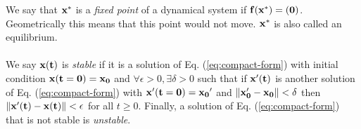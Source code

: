 We say that $\bf{x}^*$ is a \textit{fixed point} of a dynamical system if $\bf{f}(\bf{x}^*)=\bf(0)$. Geometrically this means that this point would not move. $\bf{x}^*$ is also called an equilibrium.\\
\\
We say $\bf{x}(t)$ is \textit{stable} if it is a solution of Eq. (\ref{eq:compact-form}) with initial condition $\bf{x}(t=0)=\bf{x_0}$ and $\forall \epsilon>0,\exists \delta>0$ such that if $\bf{x'}(t)$ is another solution of Eq. (\ref{eq:compact-form}) with $\bf{x'}(t=0)=\bf{x_0}'$ and $\lVert\bf{x_0'}-\bf{x_0}\rVert<\delta$ then $\lVert\bf{x'}(t)-\bf{x}(t)\rVert<\epsilon$ for all $t\geq0$\cite{Braun:1993kx}. Finally, a solution of Eq. (\ref{eq:compact-form}) that is not stable is \textit{unstable}\cite{Braun:1993kx}.
